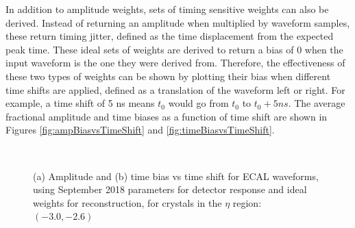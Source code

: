 In addition to amplitude weights, sets of timing sensitive weights can also be derived. Instead of returning an amplitude when multiplied by waveform samples, these return timing jitter, defined as the time displacement from the expected peak time. These ideal sets of weights are derived to return a bias of 0 when the input waveform is the one they were derived from. Therefore, the effectiveness of these two types of weights can be shown by plotting their bias when different time shifts are applied, defined as a translation of the waveform left or right. For example, a time shift of 5 ns means $t_{0}$ would go from $t_{0}$ to $t_{0} + 5ns$. The average fractional amplitude and time biases as a function of time shift are shown in Figures \ref{fig:ampBiasvsTimeShift} and \ref{fig:timeBiasvsTimeShift}. 

\begin{figure}[H]%
    \centering
    \\ \newline 
    \caption{(a) Amplitude and (b) time bias vs time shift for ECAL waveforms, using September 2018 parameters for detector response and ideal weights for reconstruction, for crystals in the $\eta$ region: $(-3.0,-2.6)$}%
\end{figure}

